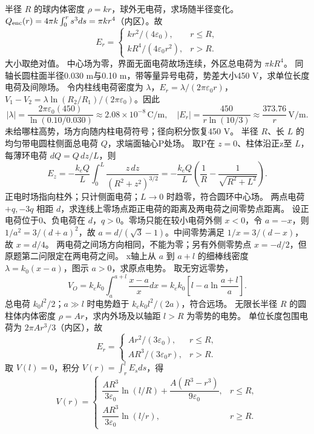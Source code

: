 \problemtext 半径 $R$ 的球内体密度 $\rho=kr$，球外无电荷，求场随半径变化。
\workings $Q_{\rm enc}(r)=4\pi k\int_0^r s^3ds=\pi kr^4$（内区）。故
\[
E_r=\begin{cases}kr^2/(4\varepsilon_0),&r\le R,\\ kR^4/(4\varepsilon_0r^2),&r>R.\end{cases}
\]
大小取绝对值。
\crosscheck 中心场为零，界面无面电荷故场连续，外区总电荷为 $\pi kR^4$。
\problemtext 同轴长圆柱面半径0.030 m与0.10 m，带等量异号电荷，势差大小450 V，求单位长度电荷及间隙场。
\workings 令内柱线电荷密度为 $\lambda$，$E_r=\lambda/(2\pi\varepsilon_0r)$，$V_1-V_2=\lambda\ln(R_2/R_1)/(2\pi\varepsilon_0)$。因此
\[
|\lambda|=\frac{2\pi\varepsilon_0(450)}{\ln(0.10/0.030)}
\approx2.08\times10^{-8}\,\mathrm{C/m},\quad
|E_r|=\frac{450}{r\ln(10/3)}\approx\frac{373.76}{r}\,\mathrm{V/m}.
\]
\crosscheck 未给哪柱高势，场方向随内柱电荷符号；径向积分恢复450 V。
\problemtext 半径 $R$、长 $L$ 的均匀带电圆柱侧面总电荷 $Q$，求端面轴心P处场。
\workings 取P在 $z=0$、柱体沿正z至 $L$，每薄环电荷 $dQ=Q\,dz/L$，则
\[
E_z=-\frac{k_e Q}{L}\int_0^L\frac{z\,dz}{(R^2+z^2)^{3/2}}
=-\frac{k_eQ}{L}\left(\frac1R-\frac1{\sqrt{R^2+L^2}}\right).
\]
\crosscheck 正电时场指向柱外；只计侧面电荷；$L\to0$ 时趋零，符合圆环中心场。
\problemtext 两点电荷 $+q,-3q$ 相距 $d$，求连线上零场点距正电荷的距离及两电荷之间零势点距离。
\workings 设正电荷位于0、负电荷在 $d$，$q>0$。零场只能在较小电荷外侧 $x<0$，令 $a=-x$，则 $1/a^2=3/(d+a)^2$，故 $a=d/(\sqrt3-1)$。中间零势满足 $1/x=3/(d-x)$，故 $x=d/4$。
\crosscheck 两电荷之间场方向相同，不能为零；另有外侧零势点 $x=-d/2$，但原题第二问限定在两电荷之间。
\problemtext x轴上从 $a$ 到 $a+l$ 的细棒线密度 $\lambda=k_0(x-a)$，图示 $a>0$，求原点电势。
\workings 取无穷远零势，
\[
V_O=k_e k_0\int_a^{a+l}\frac{x-a}{x}dx
=k_e k_0\left[l-a\ln\frac{a+l}{a}\right].
\]
\crosscheck 总电荷 $k_0l^2/2$；$a\gg l$ 时电势趋于 $k_ek_0l^2/(2a)$，符合远场。
\problemtext 无限长半径 $R$ 的圆柱体内体密度 $\rho=Ar$，求内外场及以轴距 $l>R$ 为零势的电势。
\workings 单位长度包围电荷为 $2\pi Ar^3/3$（内区），故
\[
E_r=\begin{cases}Ar^2/(3\varepsilon_0),&r\le R,\\ AR^3/(3\varepsilon_0r),&r>R.\end{cases}
\]
取 $V(l)=0$，积分 $V(r)=\int_r^l E_sds$，得
\[
V(r)=\begin{cases}
\dfrac{AR^3}{3\varepsilon_0}\ln(l/R)+\dfrac{A(R^3-r^3)}{9\varepsilon_0},&r\le R,\\
\dfrac{AR^3}{3\varepsilon_0}\ln(l/r),&r\ge R.
\end{cases}
\]
